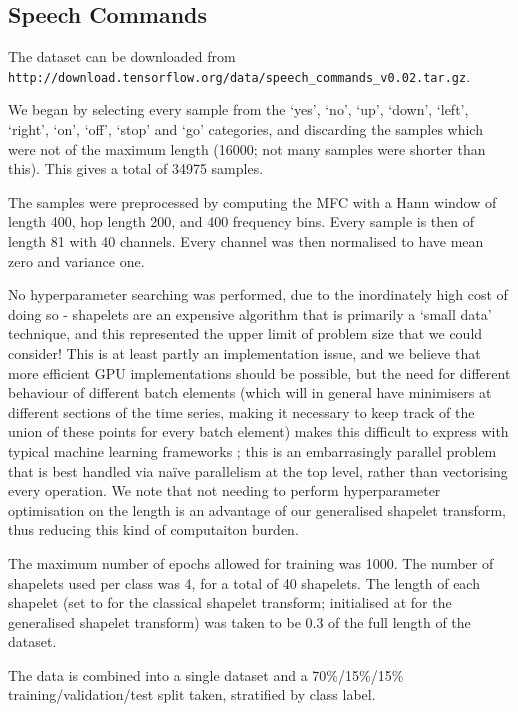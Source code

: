 \documentclass{article}
\theoremstyle{plain}
\theoremstyle{definition}
\begin{document}
	\subsection{Speech Commands}\label{apx:further_speech_commands_interpretability}
	The dataset can be downloaded from\\ \texttt{http://download.tensorflow.org/data/speech\_commands\_v0.02.tar.gz}.
	
	We began by selecting every sample from the `yes', `no', `up', `down', `left', `right', `on', `off', `stop' and `go' categories, and discarding the samples which were not of the maximum length (16000; not many samples were shorter than this). This gives a total of 34975 samples.
	
	The samples were preprocessed by computing the MFC with a Hann window of length 400, hop length 200, and 400 frequency bins. Every sample is then of length 81 with 40 channels. Every channel was then normalised to have mean zero and variance one.
	
	No hyperparameter searching was performed, due to the inordinately high cost of doing so - shapelets are an expensive algorithm that is primarily a `small data' technique, and this represented the upper limit of problem size that we could consider! This is at least partly an implementation issue, and we believe that more efficient GPU implementations should be possible, but the need for different behaviour of different batch elements (which will in general have minimisers at different sections of the time series, making it necessary to keep track of the union of these points for every batch element) makes this difficult to express with typical machine learning frameworks \cite{tensorflow, pytorch, jax}; this is an embarrasingly parallel problem that is best handled via na{\"i}ve parallelism at the top level, rather than vectorising every operation. We note that not needing to perform hyperparameter optimisation on the length is an advantage of our generalised shapelet transform, thus reducing this kind of computaiton burden.
	
	The maximum number of epochs allowed for training was 1000. The number of shapelets used per class was 4, for a total of 40 shapelets. The length of each shapelet (set to for the classical shapelet transform; initialised at for the generalised shapelet transform) was taken to be 0.3 of the full length of the dataset.
	
	The data is combined into a single dataset and a 70\%/15\%/15\% training/validation/test split taken, stratified by class label.
\end{document}
